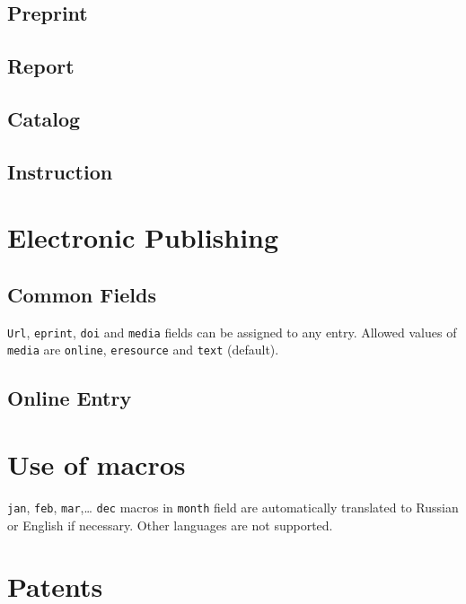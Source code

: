 \documentclass[a4paper]{article}
\begin{document}
\subsection{Preprint}
\subsection{Report}
\subsection{Catalog}
\subsection{Instruction}
\section{Electronic Publishing}
\subsection{Common Fields}
\verb|Url|, \verb|eprint|, \verb|doi| and \verb|media| fields can be assigned to any entry. Allowed values of \verb|media| are \verb|online|, \verb|eresource| and \verb|text| (default).
\subsection{Online Entry}
\section{Use of macros}
\texttt{jan}, \texttt{feb}, \texttt{mar},\ldots{} \texttt{dec} macros in \texttt{month} field
are automatically translated to Russian or English if necessary. Other languages are not supported.
\section{Patents}
\end{document}
